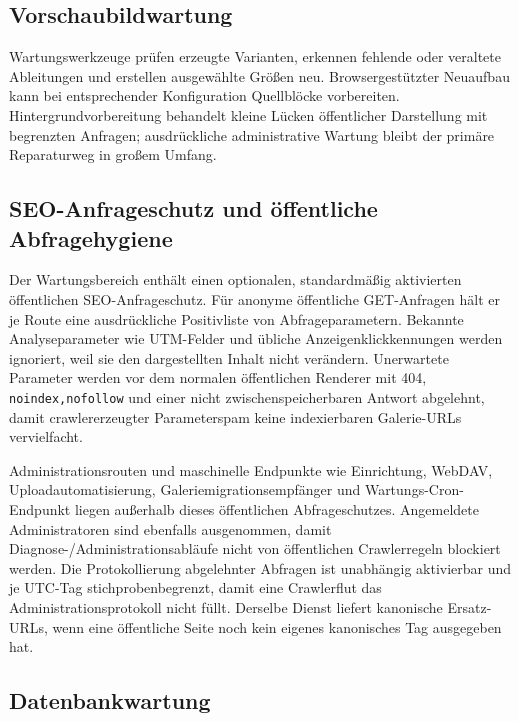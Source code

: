 \documentclass[11pt,a4paper]{article}
\newcommand{\codeword}[1]{\nolinkurl{#1}}
\begin{document}
\subsection{Vorschaubildwartung}

Wartungswerkzeuge prüfen erzeugte Varianten, erkennen fehlende oder veraltete
Ableitungen und erstellen ausgewählte Größen neu. Browsergestützter Neuaufbau
kann bei entsprechender Konfiguration Quellblöcke vorbereiten.
Hintergrundvorbereitung behandelt kleine Lücken öffentlicher Darstellung mit
begrenzten Anfragen; ausdrückliche administrative Wartung bleibt der primäre
Reparaturweg in großem Umfang.

\subsection{SEO-Anfrageschutz und öffentliche Abfragehygiene}

Der Wartungsbereich enthält einen optionalen, standardmäßig aktivierten
öffentlichen SEO-Anfrageschutz. Für anonyme öffentliche GET-Anfragen hält er je
Route eine ausdrückliche Positivliste von Abfrageparametern. Bekannte
Analyseparameter wie UTM-Felder und übliche Anzeigenklickkennungen werden
ignoriert, weil sie den dargestellten Inhalt nicht verändern. Unerwartete
Parameter werden vor dem normalen öffentlichen Renderer mit 404,
\codeword{noindex,nofollow} und einer nicht zwischenspeicherbaren Antwort
abgelehnt, damit crawlererzeugter Parameterspam keine indexierbaren Galerie-URLs
vervielfacht.

Administrationsrouten und maschinelle Endpunkte wie Einrichtung, WebDAV,
Uploadautomatisierung, Galeriemigrationsempfänger und Wartungs-Cron-Endpunkt
liegen außerhalb dieses öffentlichen Abfrageschutzes. Angemeldete
Administratoren sind ebenfalls ausgenommen, damit
Diagnose-/Administrationsabläufe nicht von öffentlichen Crawlerregeln blockiert
werden. Die Protokollierung abgelehnter Abfragen ist unabhängig aktivierbar und
je UTC-Tag stichprobenbegrenzt, damit eine Crawlerflut das
Administrationsprotokoll nicht füllt. Derselbe Dienst liefert kanonische
Ersatz-URLs, wenn eine öffentliche Seite noch kein eigenes kanonisches Tag
ausgegeben hat.

\subsection{Datenbankwartung}
\end{document}
